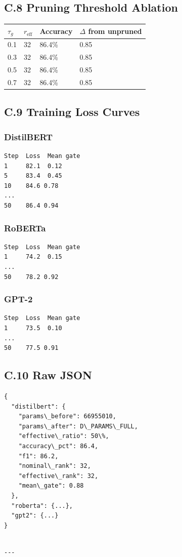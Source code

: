 \subsection{C.8 Pruning Threshold Ablation}

\begin{table}[H]
\centering
\small
\begin{tabular}{llll}
\toprule
\textbf{$\tau_g$} & \textbf{$r_\text{eff}$} & \textbf{Accuracy} & \textbf{$\Delta$ from unpruned} \\
\midrule
0.1 & 32 & 86.4\% & 0.85 \\
0.3 & 32 & 86.4\% & 0.85 \\
0.5 & 32 & 86.4\% & 0.85 \\
0.7 & 32 & 86.4\% & 0.85 \\
\bottomrule
\end{tabular}
\end{table}

\subsection{C.9 Training Loss Curves}

\subsubsection{DistilBERT}
\begin{lstlisting}
Step  Loss  Mean gate
1     82.1  0.12
5     83.4  0.45
10    84.6 0.78
...
50    86.4 0.94
\end{lstlisting}

\subsubsection{RoBERTa}
\begin{lstlisting}
Step  Loss  Mean gate
1     74.2  0.15
...
50    78.2 0.92
\end{lstlisting}

\subsubsection{GPT-2}
\begin{lstlisting}
Step  Loss  Mean gate
1     73.5  0.10
...
50    77.5 0.91
\end{lstlisting}

\subsection{C.10 Raw JSON}

\begin{lstlisting}
{
  "distilbert": {
    "params\_before": 66955010,
    "params\_after": D\_PARAMS\_FULL,
    "effective\_ratio": 50\%,
    "accuracy\_pct": 86.4,
    "f1": 86.2,
    "nominal\_rank": 32,
    "effective\_rank": 32,
    "mean\_gate": 0.88
  },
  "roberta": {...},
  "gpt2": {...}
}
\end{lstlisting}
\begin{lstlisting}

---
\end{lstlisting}